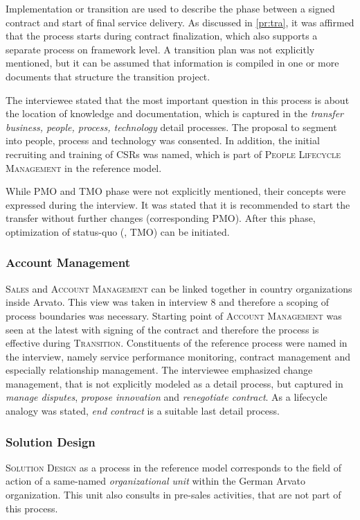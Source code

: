 	Implementation or transition are used to describe the phase between a signed contract and start of final service delivery. As discussed in \ref{pr:tra}, it was affirmed that the process starts during contract finalization, which also supports a separate process on framework level.  A transition plan was not explicitly mentioned, but it can be assumed that information is compiled in one or more documents that structure the transition project. 
	
	The interviewee stated that the most important question in this process is about the location of knowledge and documentation, which is captured in the \textit{transfer business, people, process, technology} detail processes. The proposal to segment into people, process and technology was consented. In addition, the initial recruiting and training of \acrshort{CSR}s was named, which is part of \textsc{People Lifecycle Management} in the reference model. 
	
	While \acrshort{PMO} and \acrshort{TMO} phase were not explicitly mentioned, their concepts were expressed during the interview. It was stated that it is recommended to start the transfer without further changes (corresponding \acrshort{PMO}). After this phase, optimization of status-quo (\ie, \acrshort{TMO}) can be initiated. 
	
	\subsubsection{Account Management}
	 \textsc{Sales} and \textsc{Account Management} can be linked together in country organizations inside Arvato. This view was taken in interview 8 and therefore a scoping of process boundaries was necessary. Starting point of \textsc{Account Management} was seen at the latest with signing of the contract and therefore the process is effective during \textsc{Transition}. Constituents of the reference process were named in the interview, namely service performance monitoring, contract management and especially relationship management. The interviewee emphasized change management, that is not explicitly modeled as a detail process, but captured in \textit{manage disputes}, \textit{propose innovation} and \textit{renegotiate contract}. As a lifecycle analogy was stated, \textit{end contract} is a suitable last detail process. 
          
   	\subsubsection{Solution Design}
	\textsc{Solution Design} as a process in the reference model corresponds to the field of action of a same-named \textit{organizational unit} within the German Arvato organization. This unit also consults in pre-sales activities, that are not part of this process. 
	
